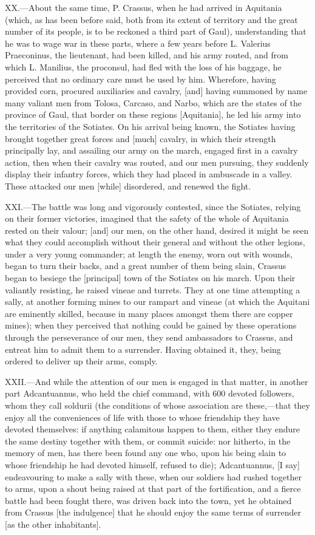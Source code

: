 XX.—About the same time, P. Crassus, when he had arrived in Aquitania
(which, as has been before said, both from its extent of territory and
the great number of its people, is to be reckoned a third part of Gaul),
understanding that he was to wage war in these parts, where a few years
before L. Valerius Praeconinus, the lieutenant, had been killed, and his
army routed, and from which L. Manilius, the proconsul, had fled with
the loss of his baggage, he perceived that no ordinary care must be used
by him. Wherefore, having provided corn, procured auxiliaries and
cavalry, [and] having summoned by name many valiant men from Tolosa,
Carcaso, and Narbo, which are the states of the province of Gaul, that
border on these regions [Aquitania], he led his army into the
territories of the Sotiates. On his arrival being known, the Sotiates
having brought together great forces and [much] cavalry, in which their
strength principally lay, and assailing our army on the march, engaged
first in a cavalry action, then when their cavalry was routed, and our
men pursuing, they suddenly display their infantry forces, which they
had placed in ambuscade in a valley. These attacked our men [while]
disordered, and renewed the fight.

XXI.—The battle was long and vigorously contested, since the Sotiates,
relying on their former victories, imagined that the safety of the whole
of Aquitania rested on their valour; [and] our men, on the other hand,
desired it might be seen what they could accomplish without their
general and without the other legions, under a very young commander; at
length the enemy, worn out with wounds, began to turn their backs, and a
great number of them being slain, Crassus began to besiege the
[principal] town of the Sotiates on his march. Upon their valiantly
resisting, he raised vineae and turrets. They at one time attempting a
sally, at another forming mines to our rampart and vineae (at which the
Aquitani are eminently skilled, because in many places amongst them
there are copper mines); when they perceived that nothing could be
gained by these operations through the perseverance of our men, they
send ambassadors to Crassus, and entreat him to admit them to a
surrender. Having obtained it, they, being ordered to deliver up their
arms, comply.

XXII.—And while the attention of our men is engaged in that matter, in
another part Adcantuannus, who held the chief command, with 600 devoted
followers, whom they call soldurii (the conditions of whose association
are these,—that they enjoy all the conveniences of life with those to
whose friendship they have devoted themselves: if anything calamitous
happen to them, either they endure the same destiny together with them,
or commit suicide: nor hitherto, in the memory of men, has there been
found any one who, upon his being slain to whose friendship he had
devoted himself, refused to die); Adcantuannus, [I say] endeavouring to
make a sally with these, when our soldiers had rushed together to arms,
upon a shout being raised at that part of the fortification, and a
fierce battle had been fought there, was driven back into the town, yet
he obtained from Crassus [the indulgence] that he should enjoy the same
terms of surrender [as the other inhabitants].

